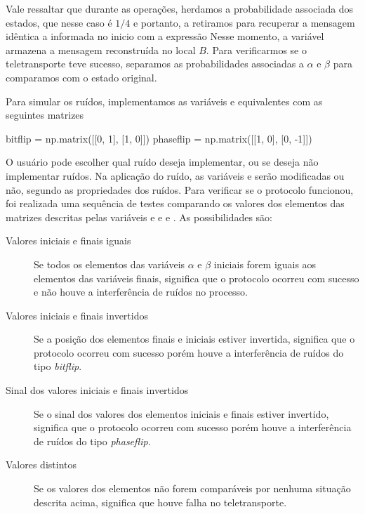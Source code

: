Vale ressaltar que durante as operações, herdamos a probabilidade associada dos estados, que nesse caso é $1/4$ e portanto, a retiramos para recuperar a mensagem idêntica a informada no inicio com a expressão Nesse momento, a variável  armazena a mensagem reconstruída no local \(B\). Para verificarmos se o teletransporte teve sucesso, separamos as probabilidades associadas a $\alpha$ e $\beta$ para comparamos com o estado original.

Para simular os ruídos, implementamos as variáveis  e  equivalentes com as seguintes matrizes
\begin{pycode}
  bitflip = np.matrix([[0, 1], [1, 0]])
  phaseflip = np.matrix([[1, 0], [0, -1]])
\end{pycode}
O usuário pode escolher qual ruído deseja implementar, ou se deseja não implementar ruídos. Na aplicação do ruído, as variáveis  e  serão modificadas ou não, segundo as propriedades dos ruídos. Para verificar se o protocolo funcionou, foi realizada uma sequência de testes comparando os valores dos elementos das matrizes descritas pelas variáveis  e  e  e . As possibilidades são:
\begin{description}
  \item [Valores iniciais e finais iguais] Se todos os elementos das variáveis $\alpha$ e $\beta$ iniciais forem iguais aos elementos das variáveis finais, significa que o protocolo ocorreu com sucesso e não houve a interferência de ruídos no processo.
  \item [Valores iniciais e finais invertidos] Se a posição dos elementos finais e iniciais estiver invertida, significa que o protocolo ocorreu com sucesso porém houve a interferência de ruídos do tipo \textit{bitflip}.
  \item [Sinal dos valores iniciais e finais invertidos] Se o sinal dos valores dos elementos iniciais e finais estiver invertido, significa que o protocolo ocorreu com sucesso porém houve a interferência de ruídos do tipo \textit{phaseflip}.
  \item [Valores distintos] Se os valores dos elementos não forem comparáveis por nenhuma situação descrita acima, significa que houve falha no teletransporte.
\end{description}
